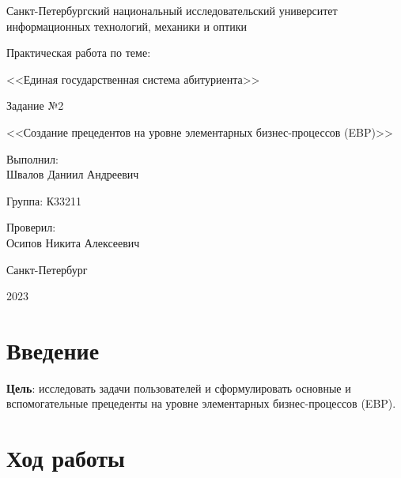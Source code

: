 \documentclass[a4paper, 14pt]{extarticle}
\begin{document}
\begin{titlepage}
  \vspace{0pt plus2fill}
  \noindent

  \vspace{0pt plus6fill}
  \begin{center}
    Санкт-Петербургский национальный исследовательский университет
    информационных технологий, механики и оптики

    \vspace{0pt plus2fill}

    Практическая работа по теме:

    <<Единая государственная система абитуриента>>

    \vspace{0pt plus1fill}

    Задание №2

    <<Создание прецедентов на уровне элементарных бизнес-процессов (EBP)>>

  \end{center}

  \vspace{0pt plus7fill}
  \begin{flushright}
    Выполнил: \\
    Швалов Даниил Андреевич

    Группа: К33211

    Проверил: \\
    Осипов Никита Алексеевич
  \end{flushright}

  \vspace{0pt plus2fill}
  \begin{center}
    Санкт-Петербург

    2023
  \end{center}
\end{titlepage}

\setcounter{page}{2}

\section{Введение}

\textbf{Цель}: исследовать задачи пользователей и сформулировать основные и
вспомогательные прецеденты на уровне элементарных бизнес-процессов (EBP).

\section{Ход работы}
\end{document}
